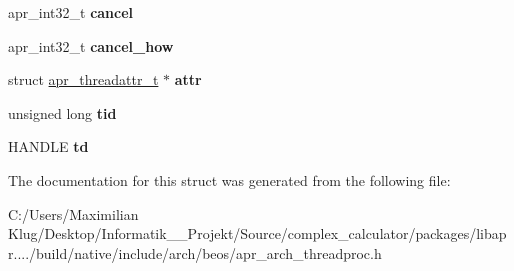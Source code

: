 \begin{DoxyCompactItemize}
\item 
\mbox{\label{structapr__thread__t_a77d772ca0c18485107e7a5c2b778c30f}} 
apr\+\_\+int32\+\_\+t {\bfseries cancel}
\item 
\mbox{\label{structapr__thread__t_a6244b09e234f465572d41e7c456f90fe}} 
apr\+\_\+int32\+\_\+t {\bfseries cancel\+\_\+how}
\item 
\mbox{\label{structapr__thread__t_ab941acbf2b6ded301d0a1d5dbc311870}} 
struct \mbox{\hyperlink{structapr__threadattr__t}{apr\+\_\+threadattr\+\_\+t}} $\ast$ {\bfseries attr}
\item 
\mbox{\label{structapr__thread__t_aa5d9bab844e08c0cc551f31492b3ab97}} 
unsigned long {\bfseries tid}
\item 
\mbox{\label{structapr__thread__t_aff27fa2be92f95db931c00d371ad5773}} 
H\+A\+N\+D\+LE {\bfseries td}
\end{DoxyCompactItemize}


The documentation for this struct was generated from the following file\+:\begin{DoxyCompactItemize}
\item 
C\+:/\+Users/\+Maximilian Klug/\+Desktop/\+Informatik\+\_\+\_\+\+Projekt/\+Source/complex\+\_\+calculator/packages/libapr..../build/native/include/arch/beos/apr\+\_\+arch\+\_\+threadproc.\+h\end{DoxyCompactItemize}
